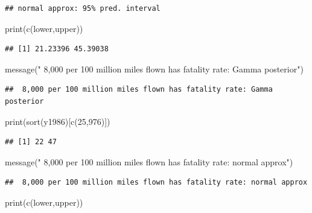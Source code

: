 \documentclass[
]{book}
\newenvironment{Shaded}{\begin{snugshade}}{\end{snugshade}}
\newcommand{\DecValTok}[1]{\textcolor[rgb]{0.00,0.00,0.81}{#1}}
\newcommand{\FunctionTok}[1]{\textcolor[rgb]{0.00,0.00,0.00}{#1}}
\newcommand{\NormalTok}[1]{#1}
\newcommand{\StringTok}[1]{\textcolor[rgb]{0.31,0.60,0.02}{#1}}
\theoremstyle{definition}
\theoremstyle{definition}
\theoremstyle{definition}
\theoremstyle{definition}
\theoremstyle{remark}
\begin{document}
\begin{verbatim}
## normal approx: 95% pred. interval
\end{verbatim}

\begin{Shaded}
\begin{Highlighting}[]
 \FunctionTok{print}\NormalTok{(}\FunctionTok{c}\NormalTok{(lower,upper))}
\end{Highlighting}
\end{Shaded}

\begin{verbatim}
## [1] 21.23396 45.39038
\end{verbatim}

\begin{Shaded}
\begin{Highlighting}[]
 \FunctionTok{message}\NormalTok{(}\StringTok{" 8,000 per 100 million miles flown has fatality rate: Gamma posterior"}\NormalTok{)}
\end{Highlighting}
\end{Shaded}

\begin{verbatim}
##  8,000 per 100 million miles flown has fatality rate: Gamma posterior
\end{verbatim}

\begin{Shaded}
\begin{Highlighting}[]
 \FunctionTok{print}\NormalTok{(}\FunctionTok{sort}\NormalTok{(y1986)[}\FunctionTok{c}\NormalTok{(}\DecValTok{25}\NormalTok{,}\DecValTok{976}\NormalTok{)])}
\end{Highlighting}
\end{Shaded}

\begin{verbatim}
## [1] 22 47
\end{verbatim}

\begin{Shaded}
\begin{Highlighting}[]
 \FunctionTok{message}\NormalTok{(}\StringTok{" 8,000 per 100 million miles flown has fatality rate: normal approx"}\NormalTok{)}
\end{Highlighting}
\end{Shaded}

\begin{verbatim}
##  8,000 per 100 million miles flown has fatality rate: normal approx
\end{verbatim}

\begin{Shaded}
\begin{Highlighting}[]
 \FunctionTok{print}\NormalTok{(}\FunctionTok{c}\NormalTok{(lower,upper))}
\end{Highlighting}
\end{Shaded}
\end{document}
